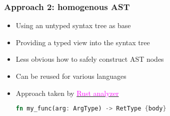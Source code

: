 \documentclass[compress,12pt,xcolor={dvipsnames}]{beamer}
\let\oldhref\href
\renewcommand{\href}[2]{\oldhref{#1}{\textcolor{magenta}{#2}}}
\begin{document}
\begin{frame}[fragile]
	\frametitle{Approach 2: homogenous AST}
	\begin{itemize}
		\item Using an untyped syntax tree as base
		\item Providing a typed view into the syntax tree
		\item Less obvious how to safely construct AST nodes
		\item Can be reused for various languages
		\item Approach taken by \href{https://github.com/rust-lang/rust-analyzer/blob/5bf2f85c8054d80424899fa581db1b192230efb5/crates/syntax/src/ast/generated/nodes.rs\#L357}{Rust analyzer}
		      \begin{lstlisting}[language=Rust, gobble=18, numbers=none]
                  fn my_func(arg: ArgType) -> RetType {body}
              \end{lstlisting}
	\end{itemize}
\end{frame}
\end{document}
